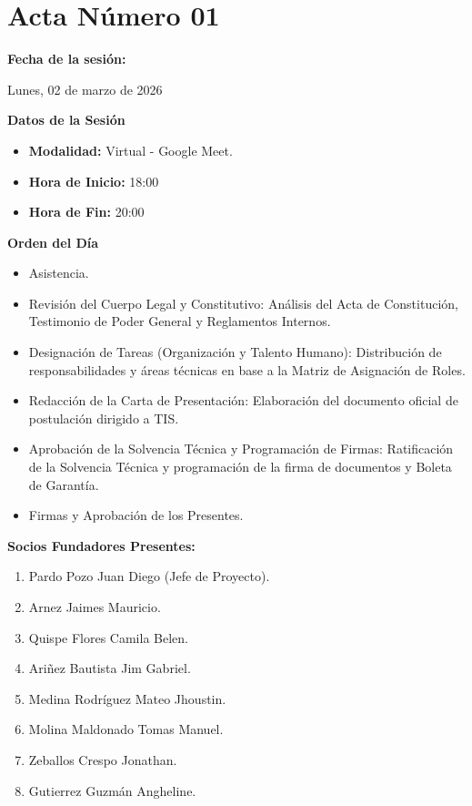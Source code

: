 \newpage
\section{Acta Número 01}
\label{sec:acta01}

\noindent \textbf{Fecha de la sesión:}\par
Lunes, 02 de marzo de 2026

\vspace*{0.5cm}
\noindent \textbf{Datos de la Sesión}
\vspace{-0.2cm}
\begin{itemize}[noitemsep]
    \item \textbf{Modalidad:} Virtual - Google Meet.
    \item \textbf{Hora de Inicio:} 18:00
    \item \textbf{Hora de Fin:} 20:00
\end{itemize}

\vspace*{0.5cm}
\noindent \textbf{Orden del Día}
\vspace{-0.2cm}
\begin{itemize}[noitemsep]
    \item Asistencia.
    \item Revisión del Cuerpo Legal y Constitutivo: Análisis del Acta de Constitución, Testimonio de Poder General y Reglamentos Internos.
    \item Designación de Tareas (Organización y Talento Humano): Distribución de responsabilidades y áreas técnicas en base a la Matriz de Asignación de Roles.
    \item Redacción de la Carta de Presentación: Elaboración del documento oficial de postulación dirigido a TIS.
    \item Aprobación de la Solvencia Técnica y Programación de Firmas: Ratificación de la Solvencia Técnica y programación de la firma de documentos y Boleta de Garantía.
    \item Firmas y Aprobación de los Presentes.
\end{itemize}

\vspace*{0.5cm}
\noindent \textbf{Socios Fundadores Presentes:}
\vspace{-0.2cm}
\begin{enumerate}[noitemsep]
    \item Pardo Pozo Juan Diego (Jefe de Proyecto).
    \item Arnez Jaimes Mauricio.
    \item Quispe Flores Camila Belen.
    \item Ariñez Bautista Jim Gabriel.
    \item Medina Rodríguez Mateo Jhoustin.
    \item Molina Maldonado Tomas Manuel.
    \item Zeballos Crespo Jonathan.
    \item Gutierrez Guzmán Angheline.
\end{enumerate}

